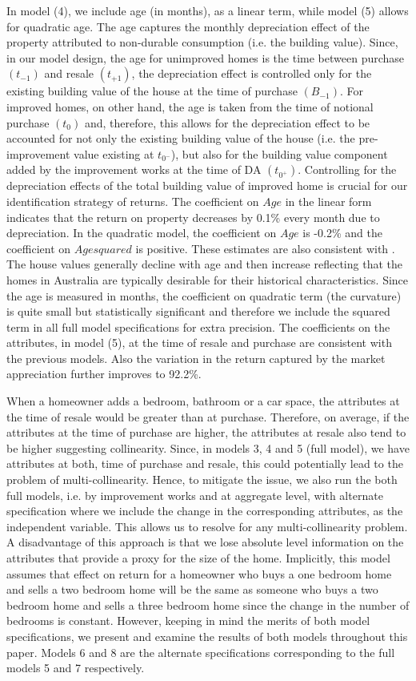 \documentclass[AEJ,reqno, draftmode]{AEA} %
\begin{document}
In model (4), we include age (in months), as a linear term, while model (5) allows for quadratic age. The age captures the monthly depreciation effect of the property attributed to non-durable consumption (i.e. the building value). Since, in our model design, the age for unimproved homes is the time between purchase $(t_{-1})$ and resale $(t_{+1})$, the depreciation effect is controlled only for the existing building value of the house at the time of purchase $(B_{-1})$. For improved homes, on other hand, the age is taken from the time of notional purchase $(t_0)$ and, therefore, this allows for the depreciation effect to be accounted for not only the existing building value of the house (i.e. the pre-improvement value existing at $t_{0^-}$), but also for the building value component added by the improvement works at the time of DA $(t_{0^+})$. Controlling for the depreciation effects of the total building value of improved home is crucial for our identification strategy of returns. The coefficient on $Age$ in the linear form indicates that the return on property decreases by 0.1\% every month due to depreciation. In the quadratic model, the coefficient on $Age$ is -0.2\% and the coefficient on $Age squared$ is positive. These estimates are also consistent with \citep{kiel1995effect}. The house values generally decline with age and then increase reflecting that the homes in Australia are typically desirable for their historical characteristics. Since the age is measured in months, the coefficient on quadratic term (the curvature) is quite small but statistically significant and therefore we include the squared term in all full model specifications for extra precision. The coefficients on the attributes, in model (5), at the time of resale and purchase are consistent with the previous models. Also the variation in the return captured by the market appreciation further improves to 92.2\%.

When a homeowner adds a bedroom, bathroom or a car space, the attributes at the time of resale would be greater than at purchase. Therefore, on average, if the attributes at the time of purchase are higher, the attributes at resale also tend to be higher suggesting collinearity. Since, in models 3, 4 and 5 (full model), we have attributes at both, time of purchase and resale, this could potentially lead to the problem of multi-collinearity. Hence, to mitigate the issue, we also run the both full models, i.e. by improvement works and at aggregate level, with alternate specification where we include the change in the corresponding attributes, as the independent variable. This allows us to resolve for any multi-collinearity problem. A disadvantage of this approach is that we lose absolute level information on the attributes that provide a proxy for the size of the home. Implicitly, this model assumes that effect on return for a homeowner who buys a one bedroom home and sells a two bedroom home will be the same as someone who buys a two bedroom home and sells a three bedroom home since the change in the number of bedrooms is constant. However, keeping in mind the merits of both model specifications, we present and examine the results of both models throughout this paper. Models 6 and 8 are the alternate specifications corresponding to the full models 5 and 7 respectively.
\end{document}
